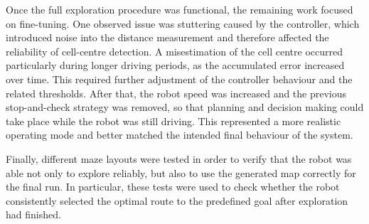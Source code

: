 Once the full exploration procedure was functional, the remaining work focused on fine-tuning. One observed issue was stuttering caused by the controller, which introduced noise into the distance measurement and therefore affected the reliability of cell-centre detection. A misestimation of the cell centre occurred particularly during longer driving periods, as the accumulated error increased over time. This required further adjustment of the controller behaviour and the related thresholds. After that, the robot speed was increased and the previous stop-and-check strategy was removed, so that planning and decision making could take place while the robot was still driving. This represented a more realistic operating mode and better matched the intended final behaviour of the system.

Finally, different maze layouts were tested in order to verify that the robot was able not only to explore reliably, but also to use the generated map correctly for the final run. In particular, these tests were used to check whether the robot consistently selected the optimal route to the predefined goal after exploration had finished.
